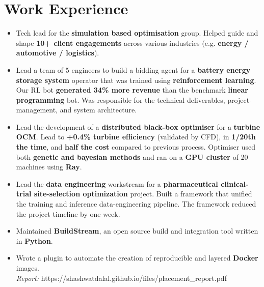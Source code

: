 \documentclass[a4paper]{deedy-resume} %
\begin{document}
\section{Work Experience}
\begin{itemize}
    \item Tech lead for the \textbf{simulation based optimisation} group. Helped guide and shape \textbf{10+ client engagements} across various industries (e.g. \textbf{energy / automotive / logistics}). 
    \item Lead a team of 5 engineers to build a bidding agent for a \textbf{battery energy storage system} operator that was trained using \textbf{reinforcement learning}. Our RL bot \textbf{generated 34\% more revenue} than the benchmark \textbf{linear programming} bot. Was responsible for the technical deliverables, project-management, and system architecture.
    \item Lead the development of a \textbf{distributed black-box optimiser} for a \textbf{turbine OCM}. Lead to \textbf{+0.4\% turbine efficiency} (validated by CFD), in \textbf{1/20th the time}, and \textbf{half the cost} compared to previous process. Optimiser used both \textbf{genetic and bayesian methods} and ran on a \textbf{GPU cluster} of 20 machines using \textbf{Ray}.
    \item Lead the \textbf{data engineering} workstream for a \textbf{pharmaceutical clinical-trial site-selection optimization} project. Built a framework that unified the training and inference data-engineering pipeline. The framework reduced the project timeline by one week.
\end{itemize} 
\begin{itemize}
    \item Maintained \textbf{BuildStream}, an open source build and integration tool written in \textbf{Python}.
    \item Wrote a plugin to automate the creation of reproducible and layered \textbf{Docker} images.
    \\
    \textit{Report:} https://shashwatdalal.github.io/files/placement\_report.pdf \\
\end{itemize}
\end{document}
